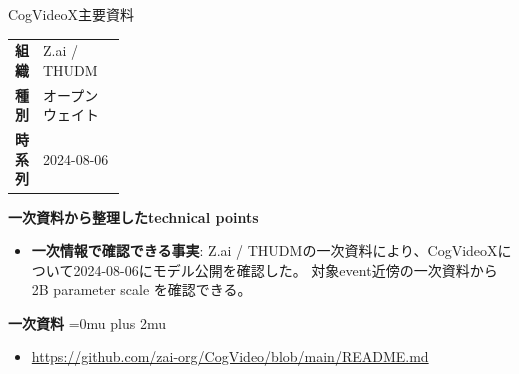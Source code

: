 \begin{technicalnote}{CogVideoX}{主要資料}
\begingroup
\begin{tabularx}{\linewidth}{@{}>{\bfseries}p{0.22\linewidth}X@{}}
組織 & Z.ai / THUDM \\
種別 & オープンウェイト \\
時系列 & 2024-08-06 \\
\end{tabularx}
\smallskip
{\bfseries 一次資料から整理したtechnical points}
\begin{itemize}[leftmargin=1.5em,itemsep=0.35em]
\item \textbf{一次情報で確認できる事実}: Z.ai / THUDMの一次資料により、CogVideoXについて2024-08-06にモデル公開を確認した。 対象event近傍の一次資料から 2B parameter scale を確認できる。
\end{itemize}
\begin{minipage}{\linewidth}
\begin{samepage}
{\bfseries 一次資料}
\begingroup\sloppy
\Urlmuskip=0mu plus 2mu\relax
\begin{itemize}[leftmargin=1.5em,itemsep=0.25em]
\item {\scriptsize\url{https://github.com/zai-org/CogVideo/blob/main/README.md}}
\end{itemize}
\endgroup
\end{samepage}
\end{minipage}
\endgroup
\end{technicalnote}
\medskip

